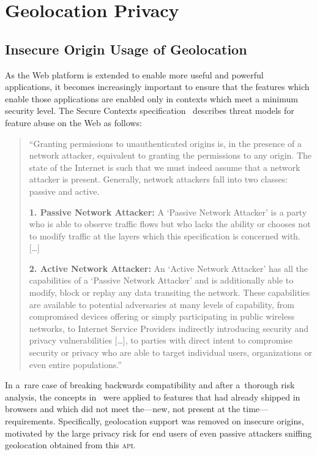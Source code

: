 \documentclass[sigconf,hyphens]{acmart}
\begin{document}
\section{Geolocation Privacy}

\subsection{Insecure Origin Usage of Geolocation}

As the Web platform is extended to enable more useful and powerful applications,
it becomes increasingly important to ensure that the features
which enable those applications are enabled only in contexts
which meet a minimum security level.
The Secure Contexts specification~\cite{west2016securecontexts}
describes threat models for feature abuse on the Web as follows:

\begin{quote}
``Granting permissions to unauthenticated origins is, in the presence of a network attacker,
equivalent to granting the permissions to any origin.
The state of the Internet is such that we must indeed assume that a network attacker is present.
Generally, network attackers fall into two classes: passive and active.

\textbf{1. Passive Network Attacker:} A `Passive Network Attacker' is a party
who is able to observe traffic flows but who lacks the ability
or chooses not to modify traffic at the layers which this specification is concerned with. [\ldots]

\textbf{2. Active Network Attacker:} An `Active Network Attacker' has all the capabilities
of a `Passive Network Attacker' and is additionally able to modify, block or replay
any data transiting the network.
These capabilities are available to potential adversaries at many levels of capability,
from compromised devices offering or simply participating in public wireless networks,
to Internet Service Providers indirectly introducing security and privacy vulnerabilities [\ldots],
to parties with direct intent to compromise security or privacy who are able to target individual users,
organizations or even entire populations.''
\end{quote}

In a~rare case of breaking backwards compatibility and after a~thorough risk analysis,
the concepts in~\cite{west2016securecontexts} were applied
to features that had already shipped in browsers
and which did not meet the---new, not present at the time---requirements.
Specifically, geolocation support was removed on insecure origins,
motivated by the large privacy risk for end users of even passive attackers
sniffing geolocation obtained from this \textsc{api}.
\end{document}
